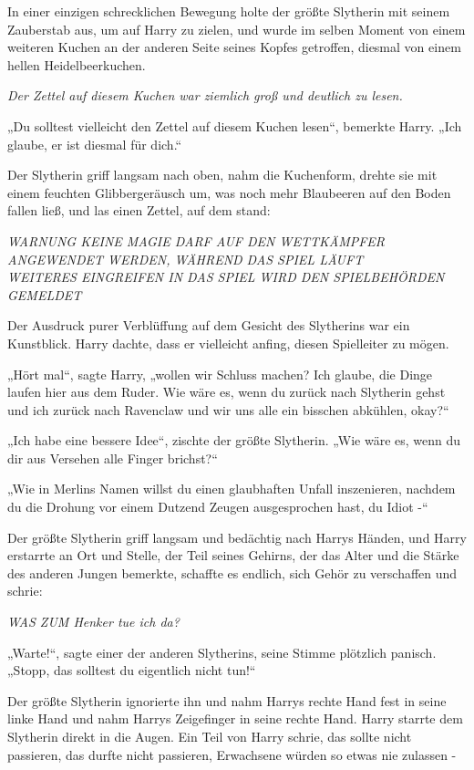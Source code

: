 {In einer einzigen schrecklichen Bewegung holte der größte Slytherin mit seinem Zauberstab aus, um auf Harry zu zielen, und wurde im selben Moment von einem weiteren Kuchen an der anderen Seite seines Kopfes getroffen, diesmal von einem hellen Heidelbeerkuchen.

\emph{Der Zettel auf diesem Kuchen war ziemlich groß und deutlich zu lesen.}

„Du solltest vielleicht den Zettel auf diesem Kuchen lesen“, bemerkte Harry. „Ich glaube, er ist diesmal für dich.“

Der Slytherin griff langsam nach oben, nahm die Kuchenform, drehte sie mit einem feuchten Glibbergeräusch um, was noch mehr Blaubeeren auf den Boden fallen ließ, und las einen Zettel, auf dem stand:

\emph{WARNUNG KEINE MAGIE DARF AUF DEN WETTKÄMPFER ANGEWENDET WERDEN, WÄHREND DAS SPIEL LÄUFT}\\ \emph{WEITERES EINGREIFEN IN DAS SPIEL WIRD DEN SPIELBEHÖRDEN GEMELDET}

Der Ausdruck purer Verblüffung auf dem Gesicht des Slytherins war ein Kunstblick. Harry dachte, dass er vielleicht anfing, diesen Spielleiter zu mögen.

„Hört mal“, sagte Harry, „wollen wir Schluss machen? Ich glaube, die Dinge laufen hier aus dem Ruder. Wie wäre es, wenn du zurück nach Slytherin gehst und ich zurück nach Ravenclaw und wir uns alle ein bisschen abkühlen, okay?“

„Ich habe eine bessere Idee“, zischte der größte Slytherin. „Wie wäre es, wenn du dir aus Versehen alle Finger brichst?“

„Wie in Merlins Namen willst du einen glaubhaften Unfall inszenieren, nachdem du die Drohung vor einem Dutzend Zeugen ausgesprochen hast, du Idiot -“

Der größte Slytherin griff langsam und bedächtig nach Harrys Händen, und Harry erstarrte an Ort und Stelle, der Teil seines Gehirns, der das Alter und die Stärke des anderen Jungen bemerkte, schaffte es endlich, sich Gehör zu verschaffen und schrie:

\emph{WAS ZUM Henker tue ich da?}

„Warte!“, sagte einer der anderen Slytherins, seine Stimme plötzlich panisch. „Stopp, das solltest du eigentlich nicht tun!“

Der größte Slytherin ignorierte ihn und nahm Harrys rechte Hand fest in seine linke Hand und nahm Harrys Zeigefinger in seine rechte Hand. Harry starrte dem Slytherin direkt in die Augen. Ein Teil von Harry schrie, das sollte nicht passieren, das durfte nicht passieren, Erwachsene würden so etwas nie zulassen -

}
